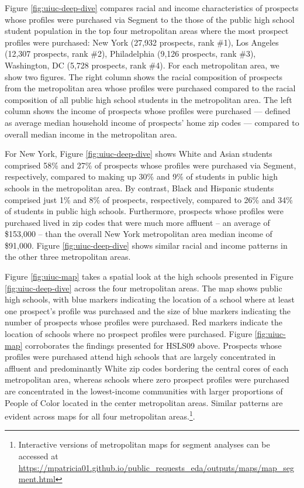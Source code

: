 \documentclass[
  12pt,
]{article}
\begin{document}
Figure \ref{fig:uiuc-deep-dive} compares racial and income characteristics of prospects whose profiles were purchased via Segment to the those of the public high school student population in the top four metropolitan areas where the most prospect profiles were purchased: New York (27,932 prospects, rank \#1), Los Angeles (12,307 prospects, rank \#2), Philadelphia (9,126 prospects, rank \#3), Washington, DC (5,728 prospects, rank \#4). For each metropolitan area, we show two figures. The right column shows the racial composition of prospects from the metropolitan area whose profiles were purchased compared to the racial composition of all public high school students in the metropolitan area. The left column shows the income of prospects whose profiles were purchased --- defined as average median household income of prospects' home zip codes --- compared to overall median income in the metropolitan area.

For New York, Figure \ref{fig:uiuc-deep-dive} shows White and Asian students comprised 58\% and 27\% of prospects whose profiles were purchased via Segment, respectively, compared to making up 30\% and 9\% of students in public high schools in the metropolitan area. By contrast, Black and Hispanic students comprised just 1\% and 8\% of prospects, respectively, compared to 26\% and 34\% of students in public high schools. Furthermore, prospects whose profiles were purchased lived in zip codes that were much more affluent -- an average of \$153,000 -- than the overall New York metropolitan area median income of \$91,000. Figure \ref{fig:uiuc-deep-dive} shows similar racial and income patterns in the other three metropolitan areas.

Figure \ref{fig:uiuc-map} takes a spatial look at the high schools presented in Figure \ref{fig:uiuc-deep-dive} across the four metropolitan areas. The map shows public high schools, with blue markers indicating the location of a school where at least one prospect's profile was purchased and the size of blue markers indicating the number of prospects whose profiles were purchased. Red markers indicate the location of schools where no prospect profiles were purchased. Figure \ref{fig:uiuc-map} corroborates the findings presented for HSLS09 above. Prospects whose profiles were purchased attend high schools that are largely concentrated in affluent and predominantly White zip codes bordering the central cores of each metropolitan area, whereas schools where zero prospect profiles were purchased are concentrated in the lowest-income communities with larger proportions of People of Color located in the center metropolitan areas. Similar patterns are evident across maps for all four metropolitan areas.\footnote{ Interactive versions of metropolitan maps for segment analyses can be accessed at \url{https://mpatricia01.github.io/public_requests_eda/outputs/maps/map_segment.html}}.
\end{document}
